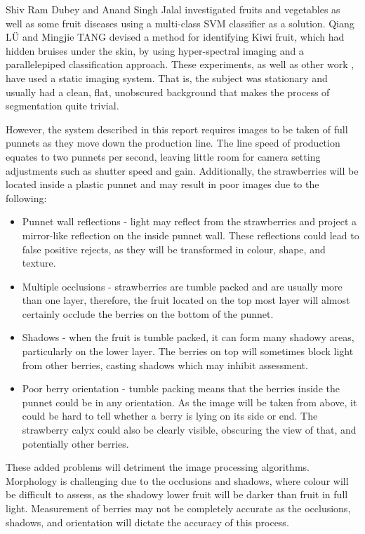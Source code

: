 \documentclass[fleqn,twoside,12pt]{report}
\begin{document}
Shiv Ram Dubey and Anand Singh Jalal \cite{shiv} investigated fruits and vegetables as well as some fruit diseases using a multi-class SVM classifier as a solution. Qiang LÜ and Mingjie TANG \cite{lu} devised a method for identifying Kiwi fruit, which had hidden bruises under the skin, by using hyper-spectral imaging and a parallelepiped classification approach. These experiments, as well as other work \cite{elmasry2,chiu}, have used a static imaging system. That is, the subject was stationary and usually had a clean, flat, unobscured background that makes the process of segmentation quite trivial. 

However, the system described in this report requires images to be taken of full punnets as they move down the production line. The line speed of production equates to two punnets per second, leaving little room for camera setting adjustments such as shutter speed and gain. Additionally, the strawberries will be located inside a plastic punnet and may result in poor images due to the following:  

\begin{itemize}
	\item Punnet wall reflections - light may reflect from the strawberries and project a mirror-like reflection on the inside punnet wall. These reflections could lead to false positive rejects, as they will be transformed in colour, shape, and texture.
	\item Multiple occlusions - strawberries are tumble packed and are usually more than one layer, therefore, the fruit located on the top most layer will almost certainly occlude the berries on the bottom of the punnet. 
	\item Shadows - when the fruit is tumble packed, it can form many shadowy areas, particularly on the lower layer. The berries on top will sometimes block light from other berries, casting shadows which may inhibit assessment.
	\item Poor berry orientation - tumble packing means that the berries inside the punnet could be in any orientation. As the image will be taken from above, it could be hard to tell whether a berry is lying on its side or end. The strawberry calyx could also be clearly visible, obscuring the view of that, and potentially other berries. 
\end{itemize}

These added problems will detriment the image processing algorithms. Morphology is challenging due to the occlusions and shadows, where colour will be difficult to assess, as the shadowy lower fruit will be darker than fruit in full light. Measurement of berries may not be completely accurate as the occlusions, shadows, and orientation will dictate the accuracy of this process.
\end{document}
